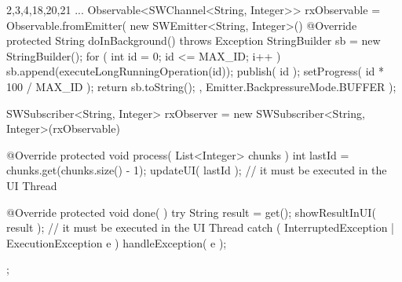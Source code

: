 \begin{javacode}{2,3,4,18,20,21}
...
Observable<SWChannel<String, Integer>> rxObservable = 
	Observable.fromEmitter(
		new SWEmitter<String, Integer>()
{
	@Override
	protected String doInBackground() throws Exception
	{
		StringBuilder sb = new StringBuilder();
		for ( int id = 0; id <= MAX_ID; i++ )
		{
			sb.append(executeLongRunningOperation(id));
			publish( id );
			setProgress( id * 100 / MAX_ID );
		}
		return sb.toString();
	}
}, Emitter.BackpressureMode.BUFFER );

SWSubscriber<String, Integer> rxObserver = 
	new SWSubscriber<String, Integer>(rxObservable)
{
	@Override
	protected void process( List<Integer> chunks )
	{
		int lastId = chunks.get(chunks.size() - 1);
		updateUI( lastId ); // it must be executed in the UI Thread
	}

	@Override
	protected void done( )
	{
		try
		{
			String result = get();
			showResultInUI( result );  // it must be executed in the UI Thread
		}
		catch ( InterruptedException | ExecutionException e )
		{
			handleException( e );
		}
	}
};
\end{javacode}
